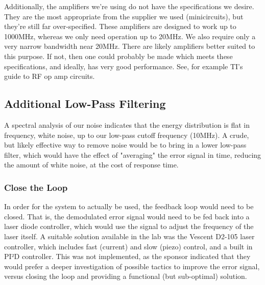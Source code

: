 Additionally, the amplifiers we're using do not have the specifications we desire.  They are the most appropriate from the supplier we used (minicircuits), but they're still far over-specified.  These amplifiers are designed to work up to 1000MHz, whereas we only need operation up to 20MHz.  We also require only a very narrow bandwidth near 20MHz.  There are likely amplifiers better suited to this purpose.  If not, then one could probably be made which meets these specifications, and ideally, has very good performance.  See, for example TI's guide to RF op amp circuits\cite{ti_amps}.

\subsection{Additional Low-Pass Filtering}

A spectral analysis of our noise indicates that the energy distribution is flat in frequency, white noise, up to our low-pass cutoff frequency (10MHz).  A crude, but likely effective way to remove noise would be to bring in a lower low-pass filter, which would have the effect of "averaging" the error signal in time, reducing the amount of white noise, at the cost of response time.


\subsubsection{Close the Loop}

In order for the system to actually be used, the feedback loop would need to be closed.  That is, the demodulated error signal would need to be fed back into a laser diode controller, which would use the signal to adjust the frequency of the laser itself.  A suitable solution available in the lab was the Vescent D2-105 laser controller, which includes fast (current) and slow (piezo) control, and a built in PI²D controller.  This was not implemented, as the sponsor indicated that they would prefer a deeper investigation of possible tactics to improve the error signal, versus closing the loop and providing a functional (but sub-optimal) solution.



